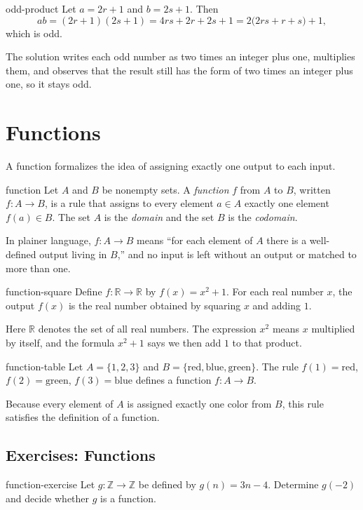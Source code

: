 \documentclass[11pt,a4paper]{article}
\begin{document}
\begin{exercisesolution}{odd-product}
Let $a=2r+1$ and $b=2s+1$. Then
\[
ab=(2r+1)(2s+1)=4rs+2r+2s+1=2\bigl(2rs+r+s\bigr)+1,
\]
which is odd.
\end{exercisesolution}
The solution writes each odd number as two times an integer plus one, multiplies them, and observes that the result still has the form of two times an integer plus one, so it stays odd.

\section{Functions}

A function formalizes the idea of assigning exactly one output to each input.
\begin{definition}{}{function}
Let $A$ and $B$ be nonempty sets. A \emph{function} $f$ from $A$ to $B$, written $f\colon A\to B$, is a rule that assigns to every element $a\in A$ exactly one element $f(a)\in B$. The set $A$ is the \emph{domain} and the set $B$ is the \emph{codomain}.
\end{definition}
In plainer language, $f\colon A\to B$ means ``for each element of $A$ there is a well-defined output living in $B$,'' and no input is left without an output or matched to more than one.

\begin{example}{}{function-square}
Define $f\colon \mathbb{R}\to \mathbb{R}$ by $f(x)=x^2+1$. For each real number $x$, the output $f(x)$ is the real number obtained by squaring $x$ and adding $1$.
\end{example}
Here $\mathbb{R}$ denotes the set of all real numbers. The expression $x^2$ means $x$ multiplied by itself, and the formula $x^2+1$ says we then add $1$ to that product.

\begin{example}{}{function-table}
Let $A=\{1,2,3\}$ and $B=\{\text{red},\text{blue},\text{green}\}$. The rule $f(1)=\text{red}$, $f(2)=\text{green}$, $f(3)=\text{blue}$ defines a function $f\colon A\to B$.
\end{example}
Because every element of $A$ is assigned exactly one color from $B$, this rule satisfies the definition of a function.

\subsection*{Exercises: Functions}

\begin{exercise}{}{function-exercise}
Let $g\colon \mathbb{Z}\to \mathbb{Z}$ be defined by $g(n)=3n-4$. Determine $g(-2)$ and decide whether $g$ is a function.
\end{exercise}
\end{document}
